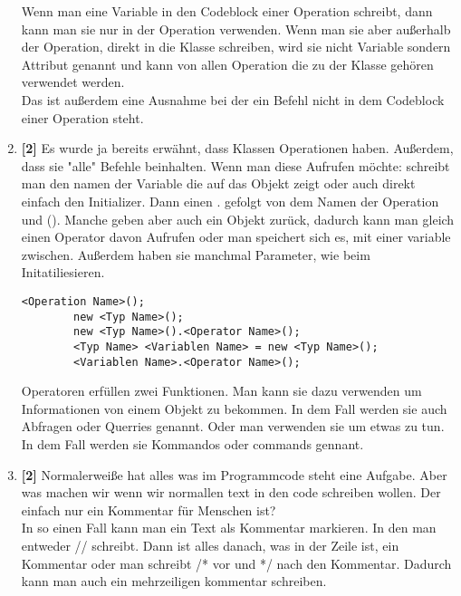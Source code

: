 \begin{enumerate}
          \begin{Infobox}[Attribute]
              Wenn man eine Variable in den Codeblock einer Operation schreibt, dann kann man sie nur in der Operation verwenden.
              Wenn man sie aber außerhalb der Operation, direkt in die Klasse schreiben, wird sie nicht Variable sondern Attribut genannt und kann von allen Operation die zu der Klasse gehören verwendet werden.\\
              Das ist außerdem eine Ausnahme bei der ein Befehl nicht in dem Codeblock einer Operation steht.
          \end{Infobox}
    \item \textbf{[2]} Es wurde ja bereits erwähnt, dass Klassen Operationen haben. Außerdem, dass sie "alle" Befehle beinhalten. Wenn man diese Aufrufen möchte: schreibt man den namen der Variable die auf das Objekt zeigt oder auch direkt einfach den Initializer. Dann einen . gefolgt von dem Namen der Operation und (). Manche geben aber auch ein Objekt zurück, dadurch kann man gleich einen Operator davon Aufrufen oder man speichert sich es, mit einer variable zwischen. Außerdem haben sie manchmal Parameter, wie beim Initatiliesieren.
          \begin{lstlisting}[title=\textbf{Commando Syntax},firstnumber=4]
        <Operation Name>();
        new <Typ Name>();
        new <Typ Name>().<Operator Name>();
        <Typ Name> <Variablen Name> = new <Typ Name>();
        <Variablen Name>.<Operator Name>();
            \end{lstlisting}
          \begin{Infobox}[Operatoren]
              Operatoren erfüllen zwei Funktionen. Man kann sie dazu verwenden um Informationen von einem Objekt zu bekommen. In dem Fall werden sie auch Abfragen oder Querries genannt.
              Oder man verwenden sie um etwas zu tun. In dem Fall werden sie Kommandos oder commands gennant.
          \end{Infobox}
    \item \textbf{[2]} Normalerweiße hat alles was im Programmcode steht eine Aufgabe. Aber was machen wir wenn wir normallen text in den code schreiben wollen. Der einfach nur ein Kommentar für Menschen ist?\\
          In so einen Fall kann man ein Text als Kommentar markieren. In den man entweder // schreibt. Dann ist alles danach, was in der Zeile ist, ein Kommentar oder man schreibt /* vor und */ nach den Kommentar. Dadurch kann man auch ein mehrzeiligen kommentar schreiben.

\end{enumerate}
